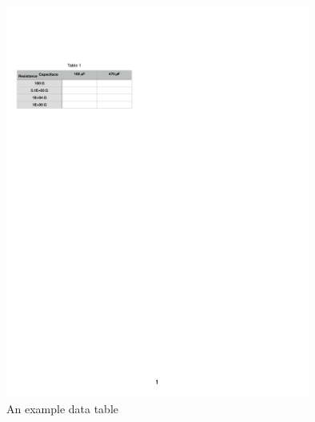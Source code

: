 \documentclass{article}
\begin{document}
\begin{figure}[ht!]
	\centering
	\includegraphics[width=10cm]{rc_table}
	\caption{An example data table}
	\label{tab}
\end{figure}
\end{document}

